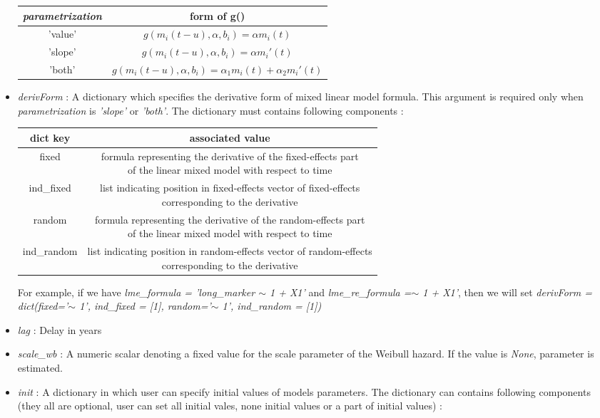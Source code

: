 \documentclass[11pt, oneside]{article}   	%
\begin{document}
\begin{itemize}
  \begin{tabular}{|c|c|}
    \hline
    \emph{parametrization} & form of g()\\
    \hline
    'value' & \(g(m_i(t-u), \alpha, b_i) = \alpha m_i(t)\)\\
    'slope' & \(g(m_i(t-u), \alpha, b_i) =  \alpha m_i'(t)\)\\
    'both' & \(g(m_i(t-u), \alpha, b_i) = \alpha_1 m_i(t) + \alpha_2 m_i'(t)\)\\
    \hline
  \end{tabular}
  
\item
  \emph{derivForm} : A dictionary which specifies the derivative form of mixed linear model formula. This argument is required only when \emph{parametrization} is  \emph{'slope'} or  \emph{'both'}. The dictionary must contains following components :
 
  \begin{tabular}{|c|c|}
    \hline
    dict key & associated value\\
    \hline
    fixed & \thead{formula representing the derivative of the fixed-effects part \\ of the linear mixed model with respect to time}\\
    ind\_fixed & \thead{list indicating position in fixed-effects vector of fixed-effects \\ corresponding to the derivative}\\
    random & \thead{formula representing the derivative of the random-effects part \\ of the linear mixed model with respect to time}\\
    ind\_random & \thead{list indicating position in random-effects vector of random-effects \\ corresponding to the derivative}\\
    \hline
  \end{tabular}
  
   For example, if we have \emph{lme\_formula = 'long\_marker \(\sim\) 1 + X1'} and  \emph{lme\_re\_formula =\(\sim\) 1 + X1'}, then we will set  \emph{derivForm = dict(fixed='\(\sim\) 1', ind\_fixed = [1], random='\(\sim\) 1', ind\_random = [1])}
\item
  \emph{lag} : Delay in years
\item
  \emph{scale\_wb} : A numeric scalar denoting a fixed value for the scale parameter of the Weibull hazard. If the value is  \emph{None}, parameter is estimated.
\item
  \emph{init} : A dictionary in which user can specify initial values of models parameters. The dictionary can contains following components (they all are optional, user can set all initial vales, none initial values or a part of initial values) :
    

\end{itemize}
\end{document}
